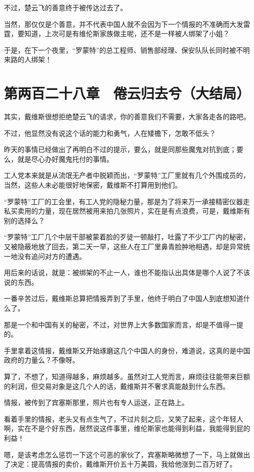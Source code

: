 不过，楚云飞的善意终于被传达过去了。

当然，那仅仅是个善意，并不代表中国人就不会因为下一个情报的不准确而大发雷霆，要知道，上次可是有维伦斯家族做主呢，还不是一样被人绑架了小姐？

于是，在下一个夜里，“罗蒙特”的总工程师、销售部经理、保安队队长同时被不明来路的人绑架！

\section{第两百二十八章　倦云归去兮（大结局）}

其实，戴维斯很想拒绝楚云飞的请求，你的善意我们不需要，大家各走各的路吧。

不过，他显然没有说这个话的能力和勇气，人在矮檐下，怎敢不低头？

昨天的事情已经做出了再明白不过的提示，要么，就是同那些魔鬼对抗到底；要么，就是尽心办好魔鬼托付的事情。

工人党本来就是从流氓无产者中脱颖而出，“罗蒙特”工厂里就有几个外围成员的，当然，这些人未必能很好地保密，戴维斯不打算用到他们。

“罗蒙特”工厂的工会里，有工人党的隐秘力量，那是为了将来万一承接精密仪器走私买卖用的力量，现在居然被用来拍几张照片，实在是有点浪费，可是，戴维斯有别的选择么？

“罗蒙特”工厂几个中层干部被蒙着脸的歹徒一顿敲打，吐露了不少工厂内的秘密，又被隐蔽地放了回去，第二天一早，这些人在工厂里鼻青脸肿地相遇，却是异常统一地没有追问对方的遭遇。

用后来的话说，就是：被绑架的不止一人，谁也不能指认出具体是哪个人说了不该说的东西。

一番辛苦过后，戴维斯总算把情报弄到了手里，他终于明白了中国人到底想知道什么了。

那是一个和中国有关的秘密，不过，对世界上大多数国家而言，却是不值得一提的。

手里拿着这情报，戴维斯又开始琢磨这几个中国人的身份，难道说，这真的是中国政府的力量么？不像呀。

算了，不想了，知道得越多，麻烦越多。虽然对工人党而言，麻烦往往能带来巨额的利润，但交易对象是这几个人的话，戴维斯并不奢求真能敲到什么东西。

情报，被传到了宾塞斯那里，照片也有专人运送，正在路上。

看着手里的情报，老头又有点生气了，不过片刻之后，又笑了起来，这个年轻人啊，实在不是个好东西，居然说这件事里，维伦斯家也能得到利益，我能得到屁的利益！

嗯，是该考虑怎么惩罚一下这个可恶的家伙了，宾塞斯略微想了一下，马上就做出了决定：提高情报的卖价，戴维斯开价五十万美圆，我给他涨到二百万好了。

